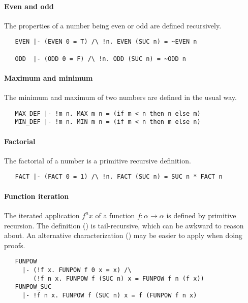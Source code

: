 \paragraph{Even and odd}

The properties of a number being even or odd are defined recursively.
%
\begin{hol}
\begin{verbatim}
   EVEN |- (EVEN 0 = T) /\ !n. EVEN (SUC n) = ~EVEN n

   ODD  |- (ODD 0 = F) /\ !n. ODD (SUC n) = ~ODD n
\end{verbatim}
\end{hol}

\paragraph{Maximum and minimum}

The minimum and maximum of two numbers are defined in the usual way.
%
\begin{hol}
\begin{verbatim}
   MAX_DEF |- !m n. MAX m n = (if m < n then n else m)
   MIN_DEF |- !m n. MIN m n = (if m < n then m else n)
\end{verbatim}
\end{hol}

\paragraph{Factorial}

The factorial of a number is a primitive recursive definition.
%
\begin{hol}
\begin{verbatim}
   FACT |- (FACT 0 = 1) /\ !n. FACT (SUC n) = SUC n * FACT n
\end{verbatim}
\end{hol}

\paragraph{Function iteration}

The iterated application $f^n x$ of a function $f : \alpha \to
\alpha$ is defined by primitive recursion. The definition
() is tail-recursive, which can be awkward to reason
about. An alternative characterization () may be easier
to apply when doing proofs.
%
\begin{hol}
\begin{verbatim}
   FUNPOW
     |- (!f x. FUNPOW f 0 x = x) /\
        (!f n x. FUNPOW f (SUC n) x = FUNPOW f n (f x))
   FUNPOW_SUC
     |- !f n x. FUNPOW f (SUC n) x = f (FUNPOW f n x)
\end{verbatim}
\end{hol}

